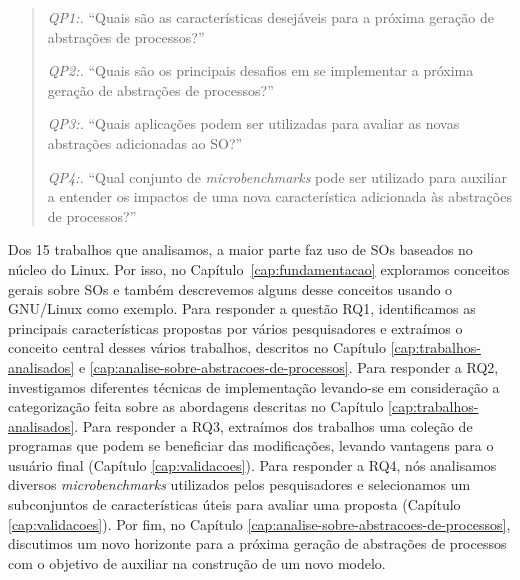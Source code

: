 \begin{quote}
 \item \textit{QP1:.} ``Quais são as características desejáveis para a próxima geração de abstrações de processos?''
 \item \textit{QP2:.} ``Quais são os principais desafios em se implementar a próxima geração de abstrações de processos?''
 \item \textit{QP3:.} ``Quais aplicações podem ser utilizadas para avaliar as novas abstrações adicionadas ao SO?''
 \item \textit{QP4:.} ``Qual conjunto de \emph{microbenchmarks} pode ser utilizado para auxiliar a entender os impactos de uma nova característica adicionada às abstrações de processos?''
\end{quote}

Dos 15 trabalhos que analisamos, a maior parte faz uso de SOs baseados no
núcleo do Linux. Por isso, no Capítulo~\ref{cap:fundamentacao} exploramos
conceitos gerais sobre SOs e também descrevemos alguns desse conceitos usando o
GNU/Linux como exemplo. Para responder a questão RQ1, identificamos as
principais características propostas por vários pesquisadores e extraímos o
conceito central desses vários trabalhos, descritos no Capítulo
\ref{cap:trabalhos-analisados} e
\ref{cap:analise-sobre-abstracoes-de-processos}. Para responder a RQ2,
investigamos diferentes técnicas de implementação levando-se em consideração a
categorização feita sobre as abordagens descritas no Capítulo
\ref{cap:trabalhos-analisados}. Para responder a RQ3, extraímos dos trabalhos
uma coleção de programas que podem se beneficiar das modificações, levando
vantagens para o usuário final (Capítulo \ref{cap:validacoes}). Para responder
a RQ4, nós analisamos diversos \emph{microbenchmarks} utilizados pelos
pesquisadores e selecionamos um subconjuntos de características úteis para
avaliar uma proposta (Capítulo \ref{cap:validacoes}). Por fim, no Capítulo
\ref{cap:analise-sobre-abstracoes-de-processos}, discutimos um novo horizonte
para a próxima geração de abstrações de processos com o objetivo de auxiliar na
construção de um novo modelo.
